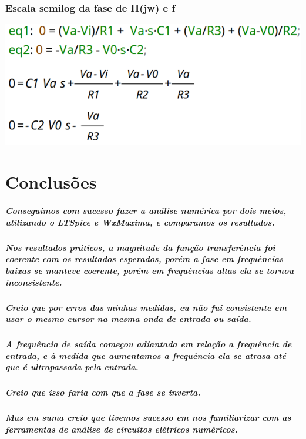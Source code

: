 \documentclass[12pt,twoside, a4paper, twocolumn]{article}
\begin{document}
\subsubsection{Escala semilog da fase de H(jw) e f}
\begin{adjustbox}{scale=0.70}
    \includegraphics{eqs.png}
\end{adjustbox}


\section{Conclusões}


\subparagraph*{Conseguimos com sucesso fazer a análise numérica por dois meios, utilizando o LTSpice e WxMaxima, e comparamos os resultados.}


\subparagraph*{Nos resultados práticos, a magnitude da função transferência foi coerente com os resultados esperados, porém a fase em frequências baixas se manteve coerente, porém em frequências altas ela se tornou inconsistente.}


\subparagraph*{Creio que por erros das minhas medidas, eu não fui consistente em usar o mesmo cursor na mesma onda de entrada ou saída.}


\subparagraph*{A frequência de saída começou adiantada em relação a frequência de entrada, e à medida que aumentamos a frequência ela se atrasa até que é ultrapassada pela entrada.}


\subparagraph*{Creio que isso faria com que a fase se inverta.}


\subparagraph*{Mas em suma creio que tivemos sucesso em nos familiarizar com as ferramentas de análise de circuitos elétricos numéricos.}
\end{document}

